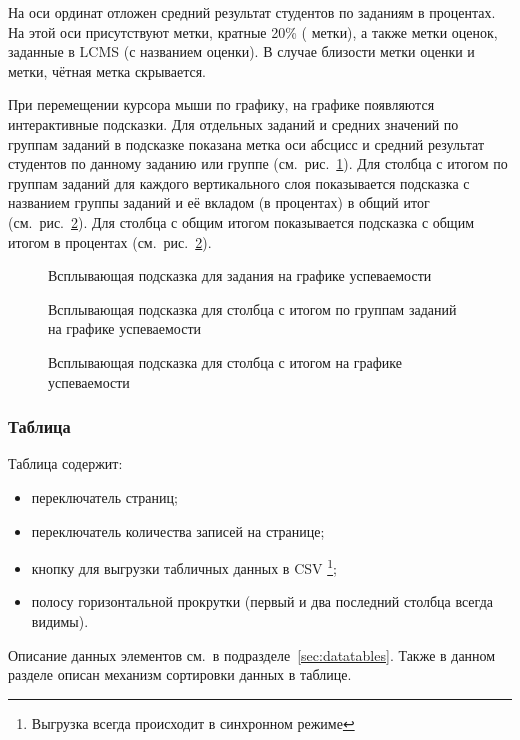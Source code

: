 На оси ординат отложен средний результат студентов по заданиям в процентах. На этой оси присутствуют метки,
кратные 20\% ( метки), а также метки оценок, заданные в LCMS (с названием оценки). 
В случае близости метки оценки и  метки, чётная метка скрывается.

При перемещении курсора мыши по графику, на графике появляются интерактивные подсказки.
Для отдельных заданий и средних значений по группам заданий в подсказке показана метка оси абсцисс
и средний результат студентов по данному заданию или группе (см.\ рис.~\ref{analytics:progress:chart:tooltip:individual}).
Для столбца с итогом по группам заданий для каждого вертикального слоя показывается подсказка
с названием группы заданий и её вкладом (в процентах) в общий итог (см.\ рис.~\ref{analytics:progress:chart:tooltip:avg_group}).
Для столбца с общим итогом показывается подсказка
с общим итогом в процентах (см.\ рис.~\ref{analytics:progress:chart:tooltip:avg_group}).


\begin{figure}[H]
	\caption{Всплывающая подсказка для задания на графике успеваемости}
	\label{analytics:progress:chart:tooltip:individual}
\end{figure}


\begin{figure}[H]
	\caption{Всплывающая подсказка для столбца с итогом по группам заданий на графике успеваемости}
	\label{analytics:progress:chart:tooltip:avg_group}
\end{figure}


\begin{figure}[H]
	\caption{Всплывающая подсказка для столбца с итогом на графике успеваемости}
	\label{analytics:progress:chart:tooltip:avg}
\end{figure}

\subsubsection{Таблица}

Таблица содержит:
\begin{itemize}
	\item переключатель страниц;
 	\item переключатель количества записей на странице;
 	\item кнопку  для выгрузки табличных данных в 
 	CSV \footnote{Выгрузка всегда происходит в синхронном режиме};
 	\item полосу горизонтальной прокрутки (первый и два последний столбца всегда видимы).
\end{itemize} 
Описание данных элементов см.\ в подразделе~\ref{sec:datatables}. Также в данном разделе описан механизм
сортировки данных в таблице. 


